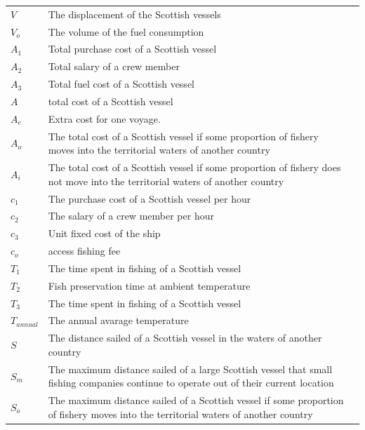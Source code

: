 \documentclass{mcmthesis}
\begin{document}
\begin{center}
\begin{longtable}{p{}p{}m{}}
$V$      & The displacement of the Scottish vessels 
                                                          \\
$V_o$      & The volume of the fuel consumption
                                                          \\
$A_1$     & Total purchase cost of a Scottish vessel
                                                        \\
$A_2$       & Total salary of a crew member                                                           \\
$A_3$      & Total fuel cost of a Scottish vessel                                        \\
$A$      & total cost of a Scottish vessel                                        \\
$A_e$      &Extra cost for one voyage.  \\
$A_o$      &The total cost of a Scottish vessel   if  some proportion of fishery moves into the territorial waters of another country\\
$A_i$      &The total cost of a Scottish vessel   if  some proportion of fishery does not move into the territorial waters of another country \\
$c_1$     & The purchase cost of a Scottish vessel per hour
                                                        \\
$c_2$       & The salary of a crew member per hour                                                     \\
$c_3$      & Unit fixed cost of the ship  \\
$c_o$      &access fishing fee\\
$T_1$     & The time spent in fishing of a Scottish vessel      \\
$T_2$       & Fish preservation time at ambient temperature        \\
$T_3$     & The time spent in fishing of a Scottish vessel      \\
$T_{annual}$     & The annual avarage temperature      \\
$S$      & The distance sailed of a Scottish vessel  in the waters of another country  \\
$S_m$      & The maximum distance sailed of a large Scottish vessel that small fishing companies continue to operate out of their current  location \\
$S_o$      & The maximum distance sailed of a Scottish vessel   if  some proportion of fishery moves into the territorial waters of another country \\

\end{longtable}
\end{center}
\end{document}

